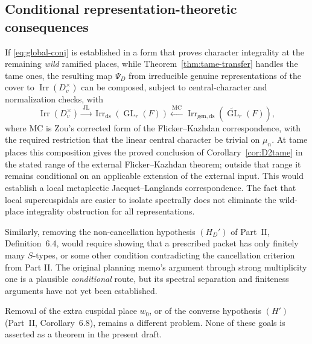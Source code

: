 \documentclass[11pt]{article}
\newcommand{\GL}{\operatorname{GL}}
\newcommand{\Irr}{\operatorname{Irr}}
\newcommand{\JL}{\mathrm{JL}}
\theoremstyle{plain}
\theoremstyle{definition}
\begin{document}
\subsection{Conditional representation-theoretic consequences}
If \eqref{eq:global-conj} is established in a form that proves character integrality at the remaining \emph{wild} ramified places, while Theorem~\ref{thm:tame-transfer} handles the tame ones, the resulting map $\Psi_D$ from irreducible genuine representations of the cover to $\Irr(D_v^\times)$ can be composed, subject to central-character and normalization checks, with
\[
\Irr(D_v^\times)\xrightarrow{\ \JL\ }
\Irr_{\mathrm{ds}}(\GL_r(F))
\xleftarrow{\ \mathrm{MC}\ }
\Irr_{\mathrm{gen,ds}}(\widetilde{\GL}_r(F)),
\]
where $\mathrm{MC}$ is Zou's corrected form of the Flicker--Kazhdan correspondence, with the required restriction that the linear central character be trivial on $\mu_n$. At tame places this composition gives the proved conclusion of
Corollary~\ref{cor:D2tame} in the stated range of the external
Flicker--Kazhdan theorem; outside that range it remains conditional
on an applicable extension of the external input.
This would establish a local metaplectic Jacquet--Langlands correspondence. The fact that local supercuspidals are easier to isolate spectrally does not eliminate the wild-place integrality obstruction for all representations.

Similarly, removing the non-cancellation hypothesis $(H_D')$ of Part~II, Definition~6.4, would require showing that a prescribed packet has only finitely many $S$-types, or some other condition contradicting the cancellation criterion from Part II. The original planning memo's argument through strong multiplicity one is a plausible \emph{conditional} route, but its spectral separation and finiteness arguments have not yet been established.

Removal of the extra cuspidal place $w_0$, or of the converse hypothesis $(H')$ (Part~II, Corollary~6.8), remains a different problem. None of these goals is asserted as a theorem in the present draft.
\end{document}
